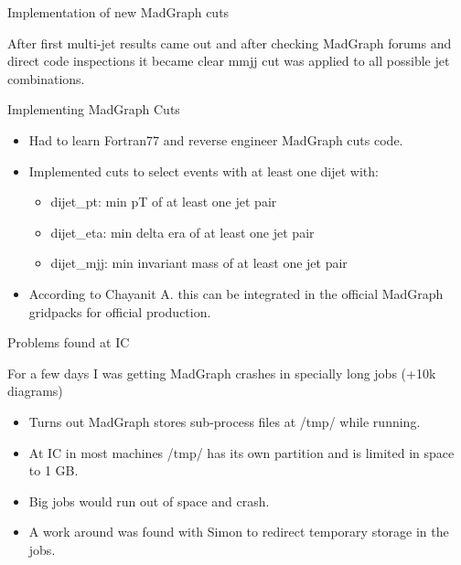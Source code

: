 \documentclass[8pt]{beamer}
\begin{document}
\begin{frame}{Implementation of new MadGraph cuts}

After first multi-jet results came out and after checking MadGraph forums and direct code inspections it became clear mmjj cut was applied to all possible jet combinations.

\begin{block}{Implementing MadGraph Cuts}

\begin{itemize}
  \item Had to learn Fortran77 and reverse engineer MadGraph cuts code.
  \item Implemented cuts to select events with at least one dijet with:
  \begin{itemize}
    \item dijet\_pt: min pT of at least one jet pair
    \item dijet\_eta: min delta era of at least one jet pair
    \item dijet\_mjj: min invariant mass of at least one jet pair
  \end{itemize}
  \item According to Chayanit A. this can be integrated in the official MadGraph gridpacks for official production.
\end{itemize}

\end{block}

\begin{block}{Problems found at IC}

For a few days I was getting MadGraph crashes in specially long jobs (+10k diagrams)

\begin{itemize}
  \item Turns out MadGraph stores sub-process files at /tmp/ while running.
  \item At IC in most machines /tmp/ has its own partition and is limited in space to 1 GB.
  \item Big jobs would run out of space and crash.
  \item A work around was found with Simon to redirect temporary storage in the jobs.
\end{itemize}
  
\end{block}

\end{frame}
\end{document}

